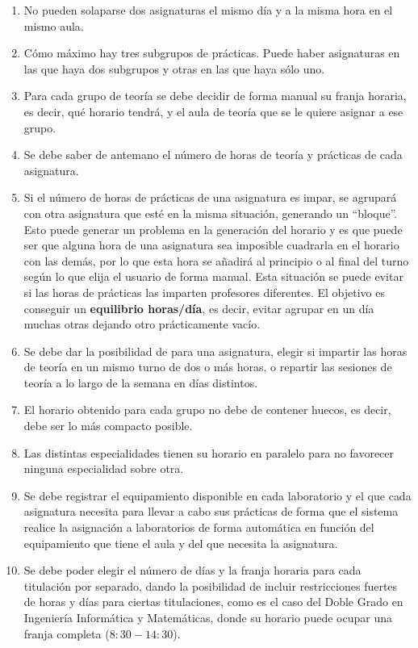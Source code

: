 \begin{enumerate}[REQ-1]
    \item No pueden solaparse dos asignaturas el mismo día y a la misma hora en el mismo aula.
    \item Cómo máximo hay tres subgrupos de prácticas. Puede haber asignaturas en las que haya dos subgrupos y otras en las que haya sólo uno.
    \item Para cada grupo de teoría se debe decidir de forma manual su franja horaria, es decir, qué horario tendrá, y el aula de teoría que se le quiere asignar a ese grupo.
    \item Se debe saber de antemano el número de horas de teoría y prácticas de cada asignatura.
    \item Si el número de horas de prácticas de una asignatura es impar, se agrupará con otra asignatura que esté en la misma situación, generando un ``bloque''. Esto puede generar un problema en la generación del horario y es que puede ser que alguna hora de una asignatura sea imposible cuadrarla en el horario con las demás, por lo que esta hora se añadirá al principio o al final del turno según lo que elija el usuario de forma manual. Esta situación se puede evitar si las horas de prácticas las imparten profesores diferentes. El objetivo es conseguir un \textbf{equilibrio horas/día}, es decir, evitar agrupar en un día muchas otras dejando otro prácticamente vacío. 
    \item Se debe dar la posibilidad de para una asignatura, elegir si impartir las horas de teoría en un mismo turno de dos o más horas, o repartir las sesiones de teoría a lo largo de la semana en días distintos.
    \item El horario obtenido para cada grupo no debe de contener huecos, es decir, debe ser lo más compacto posible.
    \item Las distintas especialidades tienen su horario en paralelo para no favorecer ninguna especialidad sobre otra.
    \item Se debe registrar el equipamiento disponible en cada laboratorio y el que cada asignatura necesita para llevar a cabo sus prácticas de forma que el sistema realice la asignación a laboratorios de forma automática en función del equipamiento que tiene el aula y del que necesita la asignatura. 
    \item Se debe poder elegir el número de días y la franja horaria para cada titulación por separado, dando la posibilidad de incluir restricciones fuertes de horas y días para ciertas titulaciones, como es el caso del Doble Grado en Ingeniería Informática y Matemáticas, donde su horario puede ocupar una franja completa ($8:30-14:30$).

\end{enumerate}
